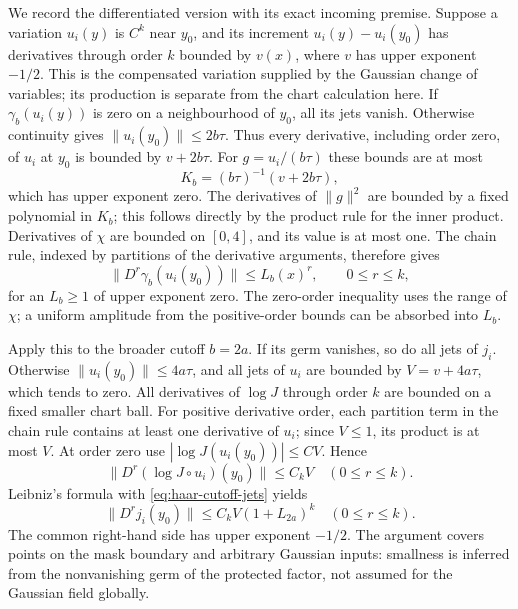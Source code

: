 We record the differentiated version with its exact incoming premise.
Suppose a variation $u_i(y)$ is $C^k$ near $y_0$, and its increment
$u_i(y)-u_i(y_0)$ has derivatives through order $k$ bounded by
$v(x)$, where $v$ has upper exponent $-1/2$. This is the compensated
variation supplied by the Gaussian change of variables; its production
is separate from the chart calculation here. If $\gamma_b(u_i(y))$
is zero on a neighbourhood of $y_0$, all its jets vanish. Otherwise
continuity gives $\|u_i(y_0)\|\le2b\tau$. Thus every derivative,
including order zero, of $u_i$ at $y_0$ is bounded by $v+2b\tau$.
For $g=u_i/(b\tau)$ these bounds are at most
\[
 K_b=(b\tau)^{-1}(v+2b\tau),
\]
which has upper exponent zero. The derivatives of $\|g\|^2$ are
bounded by a fixed polynomial in $K_b$; this follows directly by the
product rule for the inner product. Derivatives of $\chi$ are bounded
on $[0,4]$, and its value is at most one. The chain rule, indexed by
partitions of the derivative arguments, therefore gives
\begin{equation}\label{eq:haar-cutoff-jets}
 \|D^r\gamma_b(u_i(y_0))\|\le L_b(x)^r,
 \qquad 0\le r\le k,
\end{equation}
for an $L_b\ge1$ of upper exponent zero. The zero-order inequality
uses the range of $\chi$; a uniform amplitude from the positive-order
bounds can be absorbed into $L_b$.

Apply this to the broader cutoff $b=2a$. If its germ vanishes, so do
all jets of $j_i$. Otherwise $\|u_i(y_0)\|\le4a\tau$, and all jets
of $u_i$ are bounded by $V=v+4a\tau$, which tends to zero. All derivatives
of $\log J$ through order $k$ are bounded on a fixed smaller chart
ball. For positive derivative order, each partition term in the
chain rule contains at least one derivative of $u_i$; since $V\le1$,
its product is at most $V$. At order zero use
$|\log J(u_i(y_0))|\le CV$. Hence
\[
 \|D^r(\log J\circ u_i)(y_0)\|\le C_kV
 \quad(0\le r\le k).
\]
Leibniz's formula with \eqref{eq:haar-cutoff-jets} yields
\begin{equation}\label{eq:haar-chart-jets}
 \|D^r j_i(y_0)\|\le C_kV(1+L_{2a})^k
 \quad(0\le r\le k).
\end{equation}
The common right-hand side has upper exponent $-1/2$. The argument
covers points on the mask boundary and arbitrary Gaussian inputs:
smallness is inferred from the nonvanishing germ of the protected
factor, not assumed for the Gaussian field globally.
